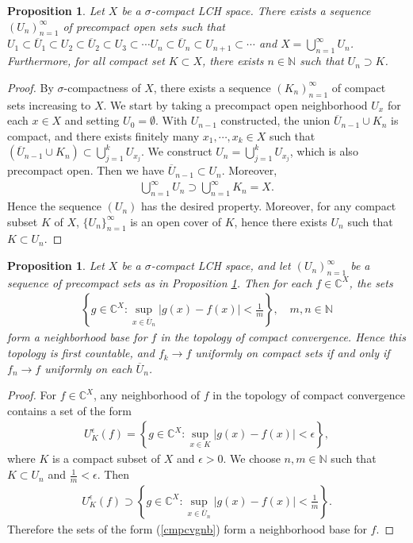 \documentclass{article}
\numberwithin{equation}{section}
\newcommand{\bbC}{\mathbb{C}}
\newcommand{\bbN}{\mathbb{N}}
\newcommand{\ol}{\overline}
\theoremstyle{plain}
\newtheorem{proposition}[theorem]{Proposition}
\theoremstyle{definition}
\begin{document}
\begin{proposition}\label{sigmacompactinc}
	Let $X$ be a $\sigma$-compact LCH space. There exists a sequence $(U_n)_{n=1}^\infty$ of precompact open sets such that $U_1\subset\ol{U}_1\subset U_2\subset\ol{U}_2\subset U_3\subset\cdots U_n\subset\ol{U}_n\subset U_{n+1}\subset\cdots$ and $X=\bigcup_{n=1}^\infty U_n$. Furthermore, for all compact set $K\subset X$, there exists $n\in\bbN$ such that $U_n\supset K$.
\end{proposition}
\begin{proof}
	By $\sigma$-compactness of $X$, there exists a sequence $(K_n)_{n=1}^\infty$ of compact sets increasing to $X$. We start by taking a precompact open neighborhood $U_x$ for each $x\in X$ and setting $U_0=\emptyset$. With $U_{n-1}$ constructed, the union $\ol{U}_{n-1}\cup K_n$ is compact, and there exists finitely many $x_1,\cdots,x_k\in X$ such that $(\ol{U}_{n-1}\cup K_n)\subset\bigcup_{j=1}^k U_{x_j}$. We construct $U_n=\bigcup_{j=1}^k U_{x_j}$, which is also precompact open. Then we have $\ol{U}_{n-1}\subset U_n$. Moreover,
	\begin{align*}
		\bigcup_{n=1}^\infty U_n\supset\bigcup_{n=1}^\infty K_n=X.
	\end{align*} 
	Hence the sequence $(U_n)$ has the desired property. Moreover, for any compact subset $K$ of $X$, $\{U_n\}_{n=1}^\infty$ is an open cover of $K$, hence there exists $U_n$ such that $K\subset U_n$.
\end{proof}

\begin{proposition}
	Let $X$ be a $\sigma$-compact LCH space, and let $(U_n)_{n=1}^\infty$ be a sequence of precompact sets as in Proposition \ref{sigmacompactinc}. Then for each $f\in\bbC^X$, the sets
	\begin{align}
		\left\{g\in\bbC^X:\sup_{x\in\ol{U}_n}\vert g(x)-f(x)\vert< \frac{1}{m}\right\},\quad m,n\in\bbN\label{cmpcvgnb}
	\end{align}
	form a neighborhood base for $f$ in the topology of compact convergence. Hence this topology is first countable, and $f_k\to f$ uniformly on compact sets if and only if $f_n\to f$ uniformly on each $\ol{U}_n$.
\end{proposition}
\begin{proof}
	For $f\in\bbC^X$, any neighborhood of $f$ in the topology of compact convergence contains a set of the form
	\begin{align*}
		U_K^\epsilon(f)=\left\{g\in\bbC^X:\sup_{x\in K}\vert g(x)-f(x)\vert<\epsilon\right\},
	\end{align*}
	where $K$ is a compact subset of $X$ and $\epsilon>0$. We choose $n,m\in\bbN$ such that $K\subset U_n$ and $\frac{1}{m}<\epsilon$. Then
	\begin{align*}
		U_K^\epsilon(f)\supset\left\{g\in\bbC^X:\sup_{x\in\ol{U}_n}\vert g(x)-f(x)\vert< \frac{1}{m}\right\}.
	\end{align*}
	Therefore the sets of the form (\ref{cmpcvgnb}) form a neighborhood base for $f$.
\end{proof}
\end{document}
